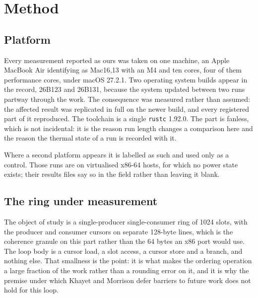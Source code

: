 \documentclass[conference]{IEEEtran}
\begin{document}
\section{Method}
\label{sec:method}

\subsection{Platform}

Every measurement reported as ours was taken on one machine, an Apple MacBook
Air identifying as Mac16,13 with an M4 and ten cores, four of them performance
cores, under macOS 27.2.1. Two operating system builds appear in the record,
26B123 and 26B131, because the system updated between two runs partway through
the work. The consequence was measured rather than assumed: the affected result
was replicated in full on the newer build, and every registered part of it
reproduced. The toolchain is a single \texttt{rustc} 1.92.0. The part is
fanless, which is not incidental: it is the reason run length changes a
comparison here and the reason the thermal state of a run is recorded with it.

Where a second platform appears it is labelled as such and used only as a
control. Those runs are on virtualised x86-64 hosts, for which no power state
exists; their results files say so in the field rather than leaving it blank.

\subsection{The ring under measurement}

The object of study is a single-producer single-consumer ring of 1024 slots,
with the producer and consumer cursors on separate 128-byte lines, which is the
coherence granule on this part rather than the 64 bytes an x86 port would use.
The loop body is a cursor load, a slot access, a cursor store and a branch, and
nothing else. That smallness is the point: it is what makes the ordering
operation a large fraction of the work rather than a rounding error on it, and
it is why the premise under which Khayet and Morrison defer barriers to future
work does not hold for this loop.
\end{document}
